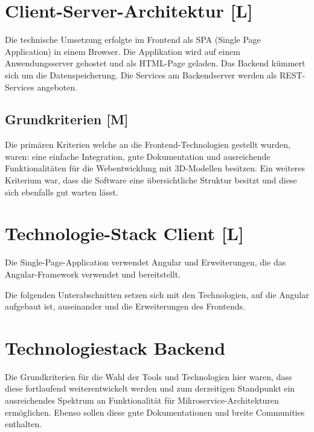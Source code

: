 \section{Client-Server-Architektur [L]}
Die technische Umsetzung erfolgte im Frontend als SPA (Single Page Application) in einem Browser. Die Applikation wird auf einem Anwendungsserver gehostet und als HTML-Page geladen. Das Backend kümmert sich um die Datenspeicherung. Die Services am Backendserver werden als REST-Services angeboten.

\subsection{Grundkriterien [M]} 
Die primären Kriterien welche an die Frontend-Technologien gestellt wurden, waren: eine einfache Integration, gute Dokumentation und ausreichende Funktionalitäten für die Webentwicklung mit 3D-Modellen besitzen. Ein weiteres Kriterium war, dass die Software eine übersichtliche Struktur besitzt und diese sich ebenfalls gut warten lässt. 

  

\section{Technologie-Stack Client [L]}
Die Single-Page-Application verwendet Angular und Erweiterungen, die das Angular-Framework verwendet und bereitstellt.

Die folgenden Unterabschnitten setzen sich mit den Technologien, auf die Angular aufgebaut ist, auseinander und die Erweiterungen des Frontends.





\section{Technologiestack Backend}
Die Grundkriterien für die Wahl der Tools und Technologien hier waren, dass diese fortlaufend weiterentwickelt werden und zum derzeitigen Standpunkt ein ausreichendes Spektrum an Funktionalität für Mikroservice-Architekturen ermöglichen.\cite{MicroserviceAbout} Ebenso sollen diese gute Dokumentationen und breite Communities enthalten. 



